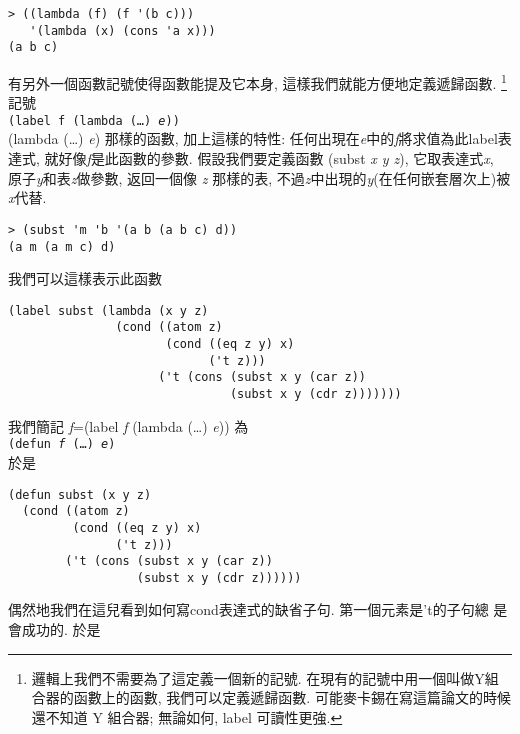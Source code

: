 \documentclass[12pt]{article}
\begin{document}
\begin{CJK}{UTF8}{bsmi}
\begin{verbatim} 
> ((lambda (f) (f '(b c))) 
   '(lambda (x) (cons 'a x))) 
(a b c) 
\end{verbatim} 
有另外一個函數記號使得函數能提及它本身, 這樣我們就能方便地定義遞歸函數.
\footnote{邏輯上我們不需要為了這定義一個新的記號. 
在現有的記號中用一個叫做Y組合器的函數上的函數, 
我們可以定義遞歸函數. 
可能麥卡錫在寫這篇論文的時候還不知道 Y 組合器; 
無論如何, label 可讀性更強.} 
記號\\ 
{\tt (label f (lambda (\pone\dots\pn) {\it e})) }\\
 (lambda (\pone\dots\pn) {\it e}) 那樣的函數,
加上這樣的特性: 
任何出現在{\it e}中的{\it f}將求值為此label表達式, 就好像{\it f}是此函數的參數. 
假設我們要定義函數 (subst {\it x y z}), 
它取表達式{\it x}, 原子{\it y}和表{\it z}做參數, 返回一個像 {\it z} 那樣的表, 
不過{\it z}中出現的{\it y}(在任何嵌套層次上)被{\it x}代替. 
\begin{verbatim} 
> (subst 'm 'b '(a b (a b c) d)) 
(a m (a m c) d) 
\end{verbatim} 
我們可以這樣表示此函數 
\begin{verbatim} 
(label subst (lambda (x y z) 
               (cond ((atom z) 
                      (cond ((eq z y) x) 
                            ('t z))) 
                     ('t (cons (subst x y (car z)) 
                               (subst x y (cdr z))))))) 
\end{verbatim} 
我們簡記 {\it f}=(label {\it f} (lambda (\pone\dots\pn) {\it e}))
為\\ 
{\tt (defun {\it f} (\pone\dots\pn) {\it e}) } \\
於是 
\begin{verbatim} 
(defun subst (x y z) 
  (cond ((atom z) 
         (cond ((eq z y) x) 
               ('t z))) 
        ('t (cons (subst x y (car z)) 
                  (subst x y (cdr z)))))) 
\end{verbatim} 
偶然地我們在這兒看到如何寫cond表達式的缺省子句. 
第一個元素是't的子句總 
是會成功的. 
於是 

\end{CJK}
\end{document}
